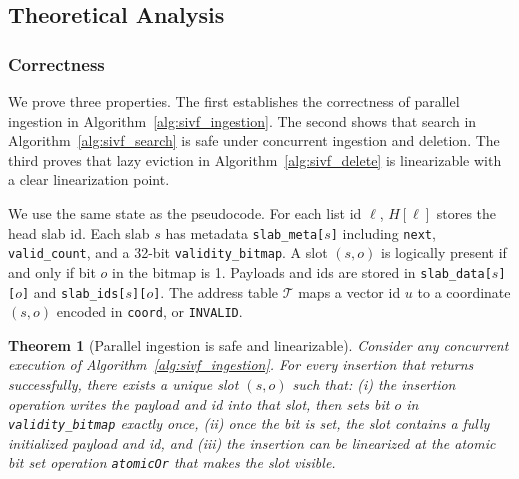 \documentclass[sigconf,nonacm]{acmart}
\theoremstyle{plain}
\newtheorem{theorem}{Theorem}[section]
\theoremstyle{definition}
\theoremstyle{remark}
\begin{document}
\subsection{Theoretical Analysis}
\label{sec:theoretical_analysis}

\subsubsection{Correctness}
\label{sec:correctness}

We prove three properties. The first establishes the correctness of parallel ingestion in Algorithm~\ref{alg:sivf_ingestion}.
The second shows that search in Algorithm~\ref{alg:sivf_search} is safe under concurrent ingestion and deletion.
The third proves that lazy eviction in Algorithm~\ref{alg:sivf_delete} is linearizable with a clear linearization point.

We use the same state as the pseudocode. For each list id $\ell$, $H[\ell]$ stores the head slab id. Each slab $s$ has
metadata \texttt{slab\_meta[$s$]} including \texttt{next}, \texttt{valid\_count}, and a 32-bit
\texttt{validity\_bitmap}. A slot $(s,o)$ is logically present if and only if bit $o$ in the bitmap is 1.
Payloads and ids are stored in \texttt{slab\_data[$s$][$o$]} and \texttt{slab\_ids[$s$][$o$]}.
The address table $\mathcal{T}$ maps a vector id $u$ to a coordinate $(s,o)$ encoded in \texttt{coord}, or \texttt{INVALID}.

\begin{theorem}[Parallel ingestion is safe and linearizable]
\label{thm:ingestion}
Consider any concurrent execution of Algorithm~\ref{alg:sivf_ingestion}.
For every insertion that returns successfully, there exists a unique slot $(s,o)$ such that:
(i) the insertion operation writes the payload and id into that slot, then sets bit $o$ in \textup{\texttt{validity\_bitmap}} exactly once,
(ii) once the bit is set, the slot contains a fully initialized payload and id, and
(iii) the insertion can be linearized at the atomic bit set operation \textup{\texttt{atomicOr}} that makes the slot visible.
\end{theorem}
\end{document}
